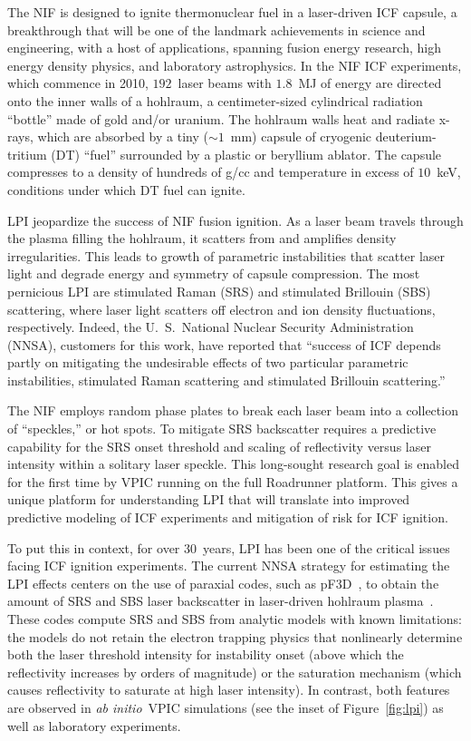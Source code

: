 \documentclass[journal,twoside]{IEEEtran}
\newcommand{\fig}[1]{Figure~\ref{fig:#1}}
\newcommand{\abinitio} {\textit{ab initio}}
\begin{document}
The NIF is designed to ignite thermonuclear fuel in a laser-driven ICF
capsule, a breakthrough that will be one of the landmark achievements
in science and engineering, with a host of applications, spanning
fusion energy research, high energy density physics, and laboratory
astrophysics.  In the NIF ICF experiments, which commence in 2010,
$192$~laser beams with $1.8$~MJ of energy are directed onto the inner
walls of a hohlraum, a centimeter-sized cylindrical radiation
``bottle'' made of gold and/or uranium.  The hohlraum walls heat and
radiate x-rays, which are absorbed by a tiny ($\sim 1$~mm) capsule of
cryogenic deuterium-tritium (DT) ``fuel'' surrounded by a plastic or
beryllium ablator.  The capsule compresses to a density of hundreds of
g/cc and temperature in excess of $10$~keV, conditions under which DT
fuel can ignite.

LPI jeopardize the success of NIF fusion ignition.  As a laser beam
travels through the plasma filling the hohlraum, it scatters from and
amplifies density irregularities.  This leads to growth of parametric
instabilities that scatter laser light and degrade energy and symmetry
of capsule compression.  The most pernicious LPI are stimulated Raman
(SRS) and stimulated Brillouin (SBS) scattering, where laser light
scatters off electron and ion density fluctuations, respectively.
Indeed, the U.~S.~National Nuclear Security Administration (NNSA),
customers for this work, have reported that ``success of ICF depends
partly on mitigating the undesirable effects of two particular
parametric instabilities, stimulated Raman scattering and stimulated
Brillouin scattering.''~\cite{LLNL_LPI_webpage}

The NIF employs random phase plates to break each laser beam into a
collection of ``speckles,'' or hot spots.  To mitigate SRS backscatter
requires a predictive capability for the SRS onset threshold and
scaling of reflectivity versus laser intensity within a solitary laser
speckle.  This long-sought research goal is enabled for the first time
by VPIC running on the full Roadrunner platform.  This gives a unique
platform for understanding LPI that will translate into improved
predictive modeling of ICF experiments and mitigation of risk for ICF
ignition.

To put this in context, for over $30$~years, LPI has been one of the
critical issues facing ICF ignition experiments.  The current NNSA
strategy for estimating the LPI effects centers on the use of paraxial
codes, such as pF3D~\cite{Berger_Phys_Plasmas_1998}, to obtain the
amount of SRS and SBS laser backscatter in laser-driven hohlraum
plasma~\cite{Glenzer_Nature_Physics_2007,Labaune_Nature_Physics_2007}.
These codes compute SRS and SBS from analytic models with known
limitations: the models do not retain the electron trapping physics
that nonlinearly determine both the laser threshold intensity for
instability onset (above which the reflectivity increases by orders of
magnitude) or the saturation mechanism (which causes reflectivity to
saturate at high laser intensity).  In contrast, both features are
observed in \abinitio\ VPIC simulations (see the inset of
\fig{lpi}) as well as laboratory
experiments.~\cite{Montgomery_et_al_Phys_Plasmas_2002}
\end{document}
